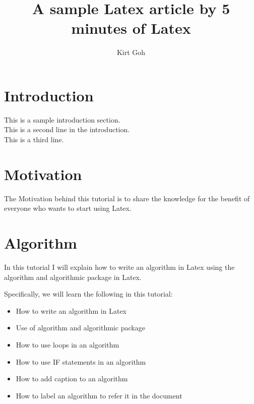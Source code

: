 \documentclass[12pt,a4paper]{article}
\begin{document}
\title{A sample Latex article by 5 minutes of Latex}
\author{Kirt Goh}
\maketitle

\section{Introduction}
This is a sample introduction section.\\
This is a second line in the introduction.\\
This is a third line.

\section{Motivation}
The Motivation behind this tutorial is to share the knowledge for the benefit of
everyone who wants to start using Latex.

\section{Algorithm} In this tutorial I will explain how to write an algorithm in
Latex using the algorithm and algorithmic package in Latex.

Specifically, we will learn the following in this tutorial:

\begin{itemize}
	\item How to write an algorithm in Latex
	\item Use of algorithm and algorithmic package
	\item How to use loops in an algorithm
	\item How to use IF statements in an algorithm
	\item How to add caption to an algorithm 
	\item How to label an algorithm to refer it in the document
\end{itemize}
\end{document}

